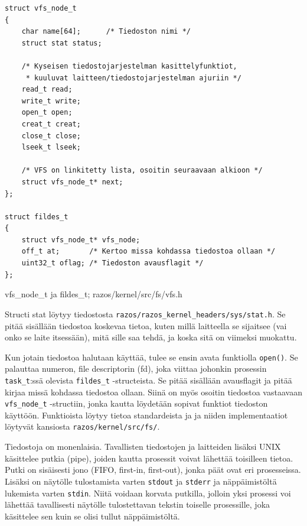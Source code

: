 \begin{listing}[H]
\begin{verbatim}
struct vfs_node_t
{
	char name[64];      /* Tiedoston nimi */
	struct stat status;

    /* Kyseisen tiedostojarjestelman kasittelyfunktiot,
     * kuuluvat laitteen/tiedostojarjestelman ajuriin */
	read_t read;
	write_t write;
	open_t open;
	creat_t creat;
	close_t close;
	lseek_t lseek;

    /* VFS on linkitetty lista, osoitin seuraavaan alkioon */
	struct vfs_node_t* next;
};

struct fildes_t
{
	struct vfs_node_t* vfs_node;
	off_t at;       /* Kertoo missa kohdassa tiedostoa ollaan */
	uint32_t oflag; /* Tiedoston avausflagit */
};
\end{verbatim}
\caption{vfs\_node\_t ja fildes\_t; razos/kernel/src/fs/vfs.h}
\label{lst:sched_switch}
\end{listing}

Structi stat löytyy tiedostosta \texttt{razos/razos\_kernel\_headers/sys/stat.h}. Se pitää sisällään tiedostoa koskevaa tietoa, kuten millä laitteella se sijaitsee (vai onko se laite itsessään), mitä sille saa tehdä, ja koska sitä on viimeksi muokattu.

\par

Kun jotain tiedostoa halutaan käyttää, tulee se ensin avata funktiolla \texttt{open()}. Se palauttaa numeron, file descriptorin (fd), joka viittaa johonkin prosessin \texttt{task\_t}:ssä olevista \texttt{fildes\_t} -structeista. Se pitää sisällään avausflagit ja pitää kirjaa missä kohdassa tiedostoa ollaan. Siinä on myös osoitin tiedostoa vastaavaan \texttt{vfs\_node\_t} -structiin, jonka kautta löydetään sopivat funktiot tiedoston käyttöön. Funktioista löytyy tietoa standardeista \parencite{POSIX} ja \parencite{ISOC99} ja niiden implementaatiot löytyvät kansiosta \texttt{razos/kernel/src/fs/}.

\par

Tiedostoja on monenlaisia. Tavallisten tiedostojen ja laitteiden lisäksi UNIX käsittelee putkia (pipe), joiden kautta prosessit voivat lähettää toisilleen tietoa. Putki on sisäisesti jono (FIFO, first-in, first-out), jonka päät ovat eri prosesseissa. Lisäksi on näytölle tulostamista varten \texttt{stdout} ja \texttt{stderr} ja näppäimistöltä lukemista varten \texttt{stdin}. Niitä voidaan korvata putkilla, jolloin yksi prosessi voi lähettää tavallisesti näytölle tulostettavan tekstin toiselle prosessille, joka käsittelee sen kuin se olisi tullut näppäimistöltä.

